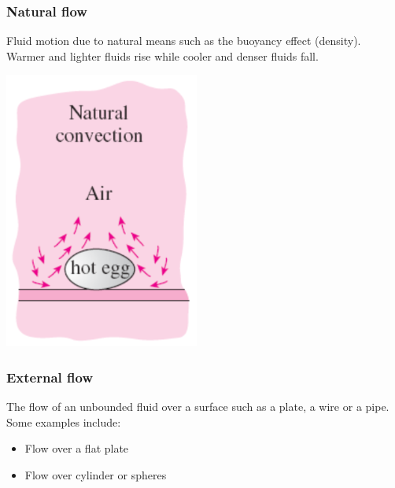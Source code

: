 \documentclass[11pt]{article}
\begin{document}
\subsubsection{Natural flow}
\label{sec:org2d270f6}
Fluid motion due to natural means such as the buoyancy effect (density). Warmer and lighter fluids rise while cooler and denser fluids fall.
\begin{center}
\includegraphics[width=.9\linewidth]{./images/natural-flow-diagram.png}
\end{center}
\subsubsection{External flow}
\label{sec:org75ab682}
The flow of an unbounded fluid over a surface such as a plate, a wire or a pipe. Some examples include:
\begin{itemize}
\item Flow over a flat plate
\item Flow over cylinder or spheres
\end{itemize}
\end{document}
